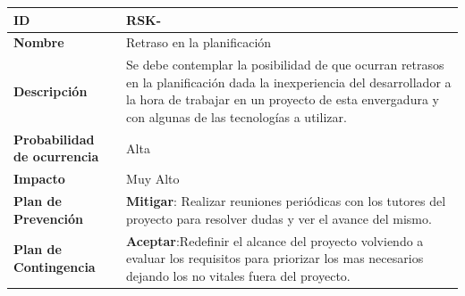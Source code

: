 \setcounter{contador_riesgos}{1}

\begin{center}
	\begin{tabular}{ | p{5.6cm} | p{8.5cm} | } 
		\hline
		
		\textbf{ID} & RSK-\arabic{contador_riesgos}
		{contador_riesgos} \\
		
		\hline 
		\textbf{Nombre} &
		Retraso en la planificación\\ 
		
		\hline
		\textbf{Descripción} & 
		Se debe contemplar la posibilidad de que ocurran retrasos en la planificación dada la inexperiencia del desarrollador a la hora de trabajar en un proyecto de esta envergadura y con algunas de las tecnologías a utilizar.\\
		
		\hline 
		\textbf{Probabilidad de ocurrencia} &
		Alta\\
		
		\hline 
		\textbf{Impacto} &
		Muy Alto\\
		
		\hline 
		\textbf{Plan de Prevención} &
		\textbf{Mitigar}: Realizar reuniones periódicas con los tutores del proyecto para resolver dudas y ver el avance del mismo.\\
		
		\hline 
		\textbf{Plan de Contingencia} &
		\textbf{Aceptar}:Redefinir el alcance del proyecto volviendo a evaluar los requisitos para priorizar los mas necesarios dejando los no vitales fuera del proyecto.\\
		
	
		\hline
	\end{tabular}
\end{center}

